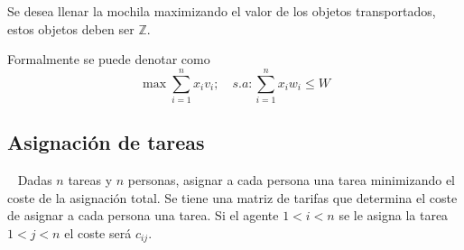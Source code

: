 Se desea llenar la mochila maximizando el valor de los objetos transportados, estos objetos deben ser $\mathbb Z$.

Formalmente se puede denotar como
$$ \max\sum_{i=1}^nx_iv_i;\quad s.a:\sum_{i=1}^nx_iw_i\le W $$



\subsection{Asignación de tareas}~
Dadas $n$ tareas y $n$ personas, asignar a cada persona una tarea minimizando el coste de la asignación total.
Se tiene una matriz de tarifas que determina el coste de asignar a cada persona una tarea.
Si el agente $1<i<n$ se le asigna la tarea $1<j<n$ el coste será $c_{ij}$.

